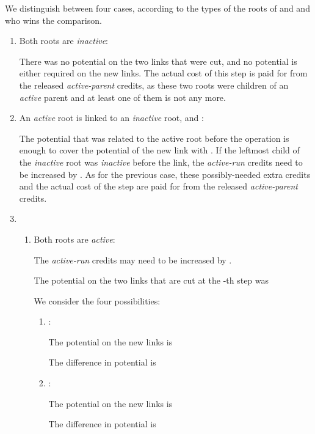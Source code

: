 We distinguish between four cases, according to the types of the roots of  and  and who wins the comparison.


\begin{enumerate}

\item Both roots are {\it inactive}:  

There was no potential on the two links that were cut, and no potential is either required on the new links. The actual cost of this step is paid for from the released {\it active-parent} credits, as these two roots were children of an {\it active} parent and at least one of them is not any more. \\
 
 
\item An {\it active} root is linked to an {\it inactive} root, and : 

The potential that was related to the active root before the operation is enough to cover the potential of the new link with .
If the leftmost child of the {\it inactive} root was {\it inactive} before the link, the {\it active-run} credits need to be increased by .  
As for the previous case, these possibly-needed extra credits and the actual cost of the step are paid for from the released {\it active-parent} credits. \\
 
 
\item 

\begin{enumerate}

\item Both roots are {\it active}: 

The {\it active-run} credits may need to be increased by .

The potential on the two links that are cut at the -th step was

 

We consider the four possibilities: \\


\begin{enumerate}

\item :

The potential on the new links is 

The difference in potential is 
 
 
\item :

The potential on the new links is
 
The difference in potential is
 

\end{enumerate}
\end{enumerate}
\end{enumerate}
